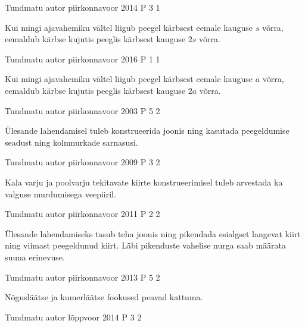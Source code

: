\documentclass[11pt]{article}
\begin{document}
{%
{Tundmatu autor} %
{piirkonnavoor} %
{2014} %
{P 3} %
{1} %
{

\ifHint
Kui mingi ajavahemiku vältel liigub peegel kärbsest eemale kauguse $s$ võrra, eemaldub kärbse kujutis peeglis kärbsest kauguse $2s$ võrra.
\fi
}

{Tundmatu autor} %
{piirkonnavoor} %
{2016} %
{P 1} %
{1} %
{

\ifHint
Kui mingi ajavahemiku vältel liigub peegel kärbsest eemale kauguse $a$ võrra, eemaldub kärbse kujutis peeglis kärbsest kauguse $2a$ võrra.
\fi
}

{Tundmatu autor} %
{piirkonnavoor} %
{2003} %
{P 5} %
{2} %
{

\ifHint
Ülesande lahendamisel tuleb konstrueerida joonis ning kasutada peegeldumise seadust ning kolmnurkade sarnasusi.
\fi
}
 


{Tundmatu autor} %
{piirkonnavoor} %
{2009} %
{P 3} %
{2} %
{

\ifHint
Kala varju ja poolvarju tekitavate kiirte konstrueerimisel tuleb arvestada ka valguse murdumisega veepiiril.
\fi
}


{Tundmatu autor} %
{piirkonnavoor} %
{2011} %
{P 2} %
{2} %
{

\ifHint
Ülesande lahendamiseks tasub teha joonis ning pikendada esialgset langevat kiirt ning viimast peegeldunud kiirt. Läbi pikenduste vahelise nurga saab määrata suuna erinevuse.
\fi
}


{Tundmatu autor} %
{piirkonnavoor} %
{2013} %
{P 5} %
{2} %
{

\ifHint
Nõgusläätse ja kumerläätse fookused peavad kattuma.
\fi
}


{Tundmatu autor} %
{lõppvoor} %
{2014} %
{P 3} %
{2} %
{

}}
\end{document}
